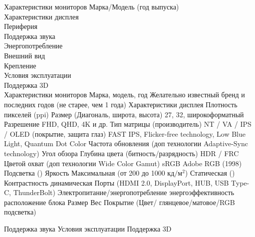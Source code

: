 \documentclass{beamer}
\begin{document}
	\begin{frame}{Характеристики мониторов}
		Марка/Модель (год выпуска)\\
		Характеристики дисплея \\
		Периферия \\
		Поддержка звука \\
		Энергопотребление \\
		Внешний вид \\
		Крепление \\
		Условия эксплуатации \\
		Поддержка 3D \\

		Характеристики мониторов
		Марка, модель, год
			Желательно известный бренд и последних годов (не старее, чем 1 года)
		Характеристики дисплея
			Плотность пикселей (ppi)
				Размер (Диагональ, широта, высота) 27, 32, широкоформатный
				Разрешение FHD, QHD, 4K и др.
			Тип матрицы (производитель)
				NT / VA / IPS / OLED (покрытие, защита глаз)
					FAST IPS, Flicker-free technology, Low Blue Light, Quantum Dot Color
				Частота обновления (доп технологии Adaptive-Sync technology)
				Угол обзора
				Глубина цвета (битность/разрядность)
					HDR / FRC
					Цветой охват (доп технологии Wide Color Gamut)
						sRGB
						Adobe RGB (1998)
				Подсветка ()
				Яркость 
					Максимальная (от 200 до 1000 $кд/м^2$)
					Статическая ()
				Контрастность динамическая
		Порты (HDMI 2.0, DisplayPort, HUB, USB Type-C, ThunderBolt)
		Электропитание/энергопотребление
			энергоэффективность
			расположение блока
		Размер
		Вес
		Покрытие (Цвет/ глянцевое/матовое/RGB подсветка)

		Поддержка звука
		Условия эксплуатации
		Поддержка 3D
		\fi


	\end{frame}
\end{document}
